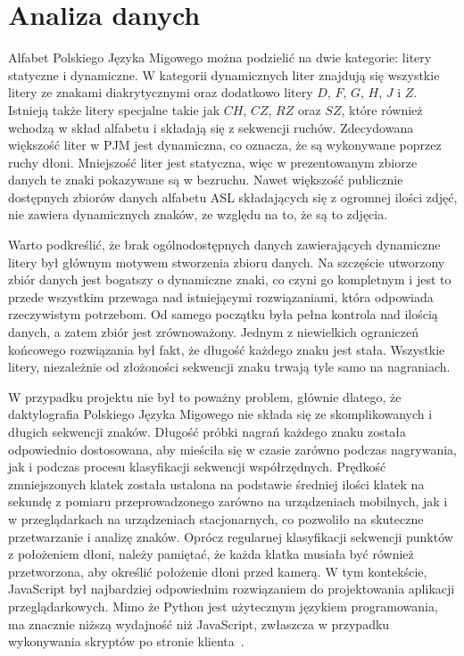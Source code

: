\section{Analiza danych}
\label{sec:data-analysis}

Alfabet Polskiego Języka Migowego można podzielić na dwie kategorie: litery statyczne i dynamiczne. W kategorii dynamicznych liter znajdują się wszystkie litery ze znakami diakrytycznymi oraz dodatkowo litery $D$, $F$, $G$, $H$, $J$ i $Z$. Istnieją także litery specjalne takie jak $CH$, $CZ$, $RZ$ oraz $SZ$, które również wchodzą w skład alfabetu i składają się z sekwencji ruchów. Zdecydowana większość liter w PJM jest dynamiczna, co oznacza, że są wykonywane poprzez ruchy dłoni. Mniejszość liter jest statyczna, więc w prezentowanym zbiorze danych te znaki pokazywane są w bezruchu. Nawet większość publicznie dostępnych zbiorów danych alfabetu ASL składających się z ogromnej ilości zdjęć, nie zawiera dynamicznych znaków, ze względu na to, że są to zdjęcia.

Warto podkreślić, że brak ogólnodostępnych danych zawierających dynamiczne litery był głównym motywem stworzenia zbioru danych. Na szczęście utworzony zbiór danych jest bogatszy o dynamiczne znaki, co czyni go kompletnym i jest to przede wszystkim przewaga nad istniejącymi rozwiązaniami, która odpowiada rzeczywistym potrzebom. Od samego początku była pełna kontrola nad ilością danych, a zatem zbiór jest zrównoważony. Jednym z niewielkich ograniczeń końcowego rozwiązania był fakt, że długość każdego znaku jest stała. Wszystkie litery, niezależnie od złożoności sekwencji znaku trwają tyle samo na nagraniach.

W przypadku projektu nie był to poważny problem, głównie dlatego, że daktylografia Polskiego Języka Migowego nie składa się ze skomplikowanych i długich sekwencji znaków. Długość próbki nagrań każdego znaku została odpowiednio dostosowana, aby mieściła się w czasie zarówno podczas nagrywania, jak i podczas procesu klasyfikacji sekwencji współrzędnych. Prędkość zmniejszonych klatek została ustalona na podstawie średniej ilości klatek na sekundę z pomiaru przeprowadzonego zarówno na urządzeniach mobilnych, jak i w przeglądarkach na urządzeniach stacjonarnych, co pozwoliło na skuteczne przetwarzanie i analizę znaków. Oprócz regularnej klasyfikacji sekwencji punktów z położeniem dłoni, należy pamiętać, że każda klatka musiała być również przetworzona, aby określić położenie dłoni przed kamerą. W tym kontekście, JavaScript był najbardziej odpowiednim rozwiązaniem do projektowania aplikacji przeglądarkowych. Mimo że Python jest użytecznym językiem programowania, ma znacznie niższą wydajność niż JavaScript, zwłaszcza w przypadku wykonywania skryptów po stronie klienta~\cite{lei2014}.

